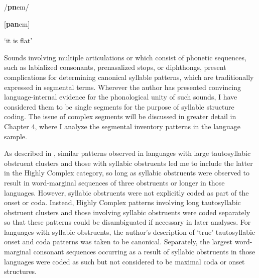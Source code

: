 /\textbf{pn}em/

[\textbf{pan}em]

‘it is flat’

\citep[35-6]{Dol2007}

\z

  Sounds involving multiple articulations or which consist of phonetic sequences, such as labialized consonants, prenasalized stops, or diphthongs, present complications for determining canonical syllable patterns, which are traditionally expressed in segmental terms. Wherever the author has presented convincing language-internal evidence for the phonological unity of such sounds, I have considered them to be single segments for the purpose of syllable structure coding. The issue of complex segments will be discussed in greater detail in Chapter 4, where I analyze the segmental inventory patterns in the language sample.

  As described in , similar patterns observed in languages with large tautosyllabic obstruent clusters and those with syllabic obstruents led me to include the latter in the Highly Complex category, so long as syllabic obstruents were observed to result in word-marginal sequences of three obstruents or longer in those languages. However, syllabic obstruents were not explicitly coded as part of the onset or coda. Instead, Highly Complex patterns involving long tautosyllabic obstruent clusters and those involving syllabic obstruents were coded separately so that these patterns could be disambiguated if necessary in later analyses. For languages with syllabic obstruents, the author’s description of ‘true’ tautosyllabic onset and coda patterns was taken to be canonical. Separately, the largest word-marginal consonant sequences occurring as a result of syllabic obstruents in those languages were coded as such but not considered to be maximal coda or onset structures.

